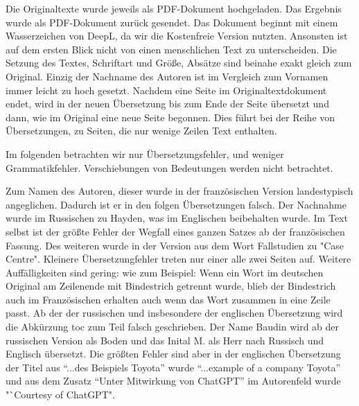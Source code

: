 Die Originaltexte wurde jeweils als PDF-Dokument hochgeladen. Das Ergebnis wurde als PDF-Dokument zurück gesendet. Das Dokument beginnt mit einem Wasserzeichen von DeepL, da wir die Kostenfreie Version nutzten.
Ansonsten ist auf dem ersten Blick nicht von einen menschlichen Text zu unterscheiden. Die Setzung des Textes, Schriftart und Größe, Absätze sind beinahe exakt gleich zum Original.
Einzig der Nachname des Autoren ist im Vergleich zum Vornamen immer leicht zu hoch gesetzt. Nachdem eine Seite im Originaltextdokument endet, wird in der neuen Übersetzung bis zum Ende der Seite übersetzt und dann, wie im Original eine neue Seite begonnen. Dies führt bei der Reihe von Übersetzungen, zu Seiten, die nur wenige Zeilen Text enthalten.

Im folgenden betrachten wir nur Übersetzungsfehler, und weniger Grammatikfehler. Verschiebungen von Bedeutungen werden nicht betrachtet. 

Zum Namen des Autoren, dieser wurde in der französischen Version landestypisch angeglichen. Dadurch ist er in den folgen Übersetzungen falsch. Der Nachnahme wurde im Russischen zu Hayden, was im Englischen beibehalten wurde.
Im Text selbst ist der größte Fehler der Wegfall eines ganzen Satzes ab der französischen Fassung. Des weiteren wurde in der Version aus dem Wort Fallstudien zu "Case Centre". Kleinere Übersetzungfehler treten nur einer alle zwei Seiten auf. Weitere Auffälligkeiten sind gering: wie zum Beispiel: Wenn ein Wort im deutschen Original am Zeilenende mit Bindestrich getrennt wurde, blieb der Bindestrich auch im Französischen erhalten auch wenn das Wort zusammen in eine Zeile passt.
Ab der der russischen und insbesondere der englischen Übersetzung wird die Abkürzung \gls{toc} zum Teil falsch geschrieben. Der Name Baudin wird ab der russischen Version als Boden und das Inital M. als Herr nach Russisch und Englisch übersetzt. Die größten Fehler sind aber in der englischen Übersetzung der Titel aus "`...des Beispiels Toyota"' wurde "`...example of a company Toyota"' und aus dem Zusatz "`Unter Mitwirkung von ChatGPT"' im Autorenfeld wurde "`Courtesy of ChatGPT".